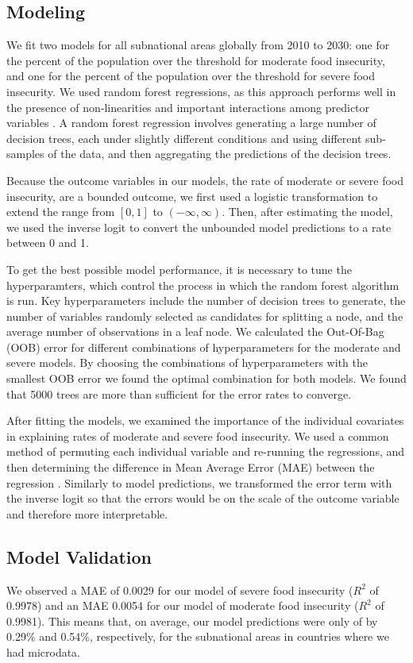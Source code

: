 \documentclass{article}
\begin{document}
\subsection{Modeling}
We fit two models for all subnational areas globally from 2010 to 2030: one for the percent of the population over the threshold for moderate food insecurity, and one for the percent of the population over the threshold for severe food insecurity.  We used random forest regressions, as this approach performs well in the presence of non-linearities and important interactions among predictor variables \citep{hastie2009elements}.  A random forest regression involves generating a large number of decision trees, each under slightly different conditions and using different sub-samples of the data, and then aggregating the predictions of the decision trees.

Because the outcome variables in our models, the rate of moderate or severe food insecurity, are a bounded outcome, we first used a logistic transformation to extend the range from $[0,1]$ to $(-\infty, \infty)$.  Then, after estimating the model, we used the inverse logit to convert the unbounded model predictions to a rate between 0 and 1.

To get the best possible model performance, it is necessary to tune the hyperparamters, which control the process in which the random forest algorithm is run.  Key hyperparameters include the number of decision trees to generate, the number of variables randomly selected as candidates for splitting a node, and the average number of observations in a leaf node.  We calculated the Out-Of-Bag (OOB) error for different combinations of hyperparameters for the moderate and severe models. By choosing the combinations of hyperparameters with the smallest OOB error we found the optimal combination for both models. We found that 5000 trees are more than sufficient for the error rates to converge.

After fitting the models, we examined the importance of the individual covariates in explaining rates of moderate and severe food insecurity. We used a common method of permuting each individual variable and re-running the regressions, and then determining the difference in Mean Average Error (MAE) between the regression \citep{ishwaran2007variable}.  Similarly to model predictions, we transformed the error term with the inverse logit so that the errors would be on the scale of the outcome variable and therefore more interpretable.

\subsection{Model Validation}
We observed a MAE of 0.0029 for our model of severe food insecurity ($R^2$ of 0.9978) and an MAE 0.0054 for our model of moderate food insecurity ($R^2$ of 0.9981).  This means that, on average, our model predictions were only of by 0.29\% and 0.54\%, respectively, for the subnational areas in countries where we had microdata. 
\end{document}

